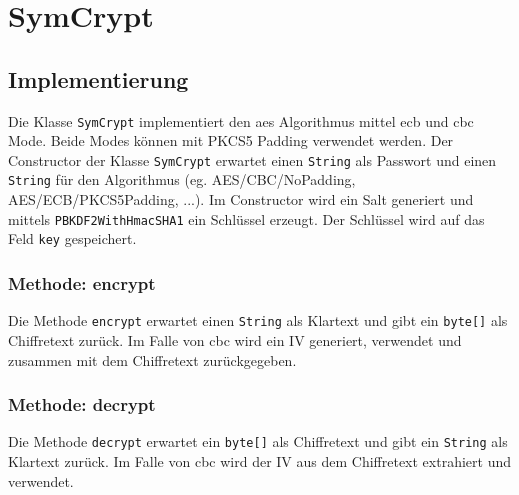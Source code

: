 \chapter{SymCrypt}

\section{Implementierung}
Die Klasse \texttt{SymCrypt} implementiert den \gls{aes} Algorithmus mittel \gls{ecb} und \gls{cbc} Mode. Beide Modes können mit PKCS5 Padding verwendet werden. Der Constructor der Klasse \texttt{SymCrypt} erwartet einen \texttt{String} als Passwort und einen \texttt{String} für den Algorithmus (eg. \glqq AES/CBC/NoPadding\grqq, \glqq AES/ECB/PKCS5Padding\grqq , ...).
Im Constructor wird ein Salt generiert und mittels \texttt{PBKDF2WithHmacSHA1} ein Schlüssel erzeugt. Der Schlüssel wird auf das Feld \texttt{key} gespeichert.

\subsection{Methode: encrypt}
Die Methode \texttt{encrypt} erwartet einen \texttt{String} als Klartext und gibt ein \texttt{byte[]} als Chiffretext zurück. Im Falle von \gls{cbc} wird ein IV generiert, verwendet und zusammen mit dem Chiffretext zurückgegeben.

\subsection{Methode: decrypt}
Die Methode \texttt{decrypt} erwartet ein \texttt{byte[]} als Chiffretext und gibt ein \texttt{String} als Klartext zurück. Im Falle von \gls{cbc} wird der IV aus dem Chiffretext extrahiert und verwendet.
